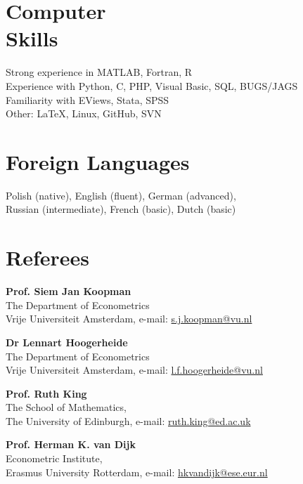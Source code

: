 \documentclass[margin,line]{resume}
\begin{document}
\begin{resume}
   \section{\mysidestyle Computer\\ Skills} 
   Strong experience in MATLAB, Fortran, R   \vspace{1mm}\\
   Experience with Python, C, PHP, Visual Basic, SQL, BUGS/JAGS \vspace{1mm}\\
	Familiarity with EViews, Stata, SPSS \vspace{1mm} \\
	Other: \LaTeX, Linux, GitHub, SVN  

   \section{\mysidestyle Foreign Languages}  
	Polish (native), English (fluent),  German (advanced),    \\
    Russian (intermediate),  French (basic),  Dutch (basic)

 
    
\section{\mysidestyle Referees} 

 \textbf{Prof. Siem Jan Koopman} \\    
 The Department of Econometrics \\
 Vrije Universiteit Amsterdam, e-mail: \url{s.j.koopman@vu.nl}

 \textbf{Dr Lennart Hoogerheide} \\  
 The Department of Econometrics \\  
 Vrije Universiteit Amsterdam, e-mail: \url{l.f.hoogerheide@vu.nl}

 \textbf{Prof. Ruth King} \\  
 The School of Mathematics,\\  
 The University of Edinburgh, e-mail: \url{ruth.king@ed.ac.uk}
 
 \textbf{Prof. Herman K. van Dijk} \\  
 Econometric Institute,\\  
 Erasmus University Rotterdam, e-mail: \url{hkvandijk@ese.eur.nl }
\end{resume}
\end{document}

